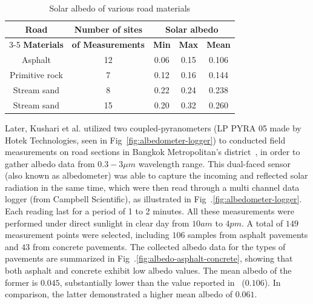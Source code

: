 \begin{table}[h]
    \centering
    \caption{Solar albedo of various road materials}
    \label{tab:solar-albedo-4-road-materials}
    \begin{tabular}{ccccc}
        \hline
        \hline
        \multirow{2}{*}{\textbf{Road}} & \multirow{2}{*}{\textbf{Number of sites}} & \multicolumn{3}{c}{\textbf{Solar albedo}}                                \\
        \cline{3-5}
        \textbf{Materials}                  & \textbf{of Measurements}                  & \textbf{Min}                              & \textbf{Max} & \textbf{Mean} \\
        \hline
        Asphalt                        & 12                                        & 0.06                                      & 0.15         & 0.106         \\
        \hline
        Primitive rock                 & 7                                         & 0.12                                      & 0.16         & 0.144         \\
        \hline
        Stream sand                    & 8                                         & 0.22                                      & 0.24         & 0.238         \\
        \hline
        Stream sand                    & 15                                        & 0.20                                      & 0.32         & 0.260         \\
        \hline
        \hline
    \end{tabular}
\end{table}


Later, Kushari et al. utilized two coupled-pyranometers (LP PYRA 05 made by Hotek Technologies, seen in Fig~\ref{fig:albedometer-logger}) to conducted field measurements on road sections in Bangkok Metropolitan's district~\cite{2011_KUSHARI}, in order to gather albedo data from $0.3 - 3 \mu m$ wavelength range.
This dual-faced sensor (also known as albedometer) was able to capture the incoming and reflected solar radiation in the same time, which were then read through a multi channel data logger (from Campbell Scientific), as illustrated in Fig~.\ref{fig:albedometer-logger}.
Each reading last for a period of 1 to 2 minutes.
All these measurements were performed under direct sunlight in clear day from $10am$ to $4pm$.
A total of $149$ measurement points were selected, including $106$ samples from asphalt pavements and $43$ from concrete pavements.
The collected albedo data for the types of pavements are summarized in Fig~.\ref{fig:albedo-asphalt-concrete}, showing that both asphalt and concrete exhibit low albedo values.
The mean albedo of the former is $0.045$, substantially lower than the value reported in~\cite{1988_Blumthaler} ($0.106$).
In comparison, the latter demonstrated a higher mean albedo of $0.061$.

